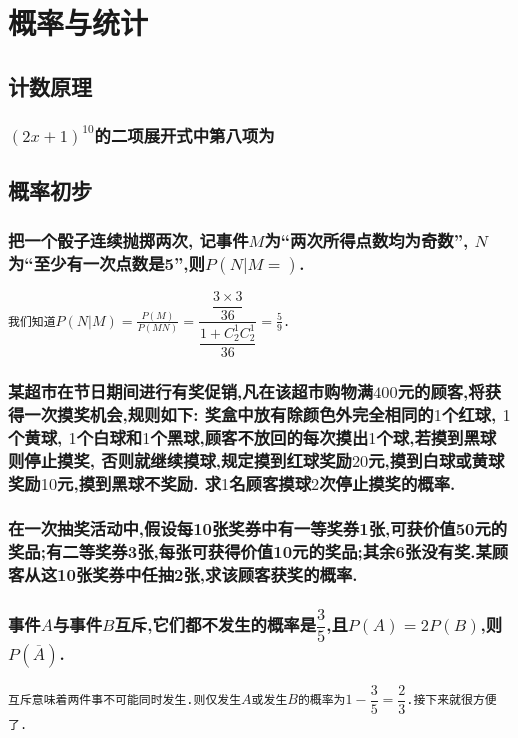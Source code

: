 \documentclass[oneside]{book}
\newcommand{\1}{\underline{\makebox[1cm]{}}}
\newcommand{\2}{\underline{\makebox[2cm]{}}}
\newcommand{\3}{\underline{\makebox[3cm]{}}}
\newcommand{\4}{\underline{\makebox[4cm]{}}}
\newcommand{\blk}{\vspace*{1\baselineskip} }
\newcommand{\blkx}{\vspace*{4\baselineskip} }
\newcommand{\blkc}{\vspace*{6\baselineskip} }
\newcommand{\lge}{\large \texttt}
\newlength{\la}
\begin{document}
\part{概率与统计}

    \chapter{计数原理}
        \section{$(2x+1)^{10}$的二项展开式中第八项为\2} 
        \blk

    \chapter{概率初步}
        \section{把一个骰子连续抛掷两次, 记事件$M$为``两次所得点数均为奇数'', $N$为``至少有一次点数是5'',则$P(N | M = )$\2.}
        \lge{我们知道$P(N|M) = \frac{P(M)}{P(MN)} = \dfrac{\dfrac{3 \times 3}{36}}{\dfrac{1 + C_2^1C_2^1}{36}} = \frac{5}{9}$.}

        \section{某超市在节日期间进行有奖促销,凡在该超市购物满$400$元的顾客,将获得一次摸奖机会,规则如下:
        奖盒中放有除颜色外完全相同的$1$个红球, $1$个黄球, $1$个白球和$1$个黑球,顾客不放回的每次摸出$1$个球,若摸到黑球则停止摸奖,
        否则就继续摸球,规定摸到红球奖励$20$元,摸到白球或黄球奖励$10$元,摸到黑球不奖励. 求$1$名顾客摸球$2$次停止摸奖的概率.}
        \blkx

        \section{在一次抽奖活动中,假设每10张奖券中有一等奖券1张,可获价值50元的奖品;有二等奖券3张,每张可获得价值10元的奖品;其余6张没有奖.某顾客从这10张奖券中任抽2张,求该顾客获奖的概率.}
        \blkc

        \section{事件$A$与事件$B$互斥,它们都不发生的概率是$\dfrac{3}{5}$,且$P(A)=2P(B)$,则$P(\overline{A}) $\2.}
        \lge{互斥意味着两件事不可能同时发生.则仅发生$A$或发生$B$的概率为$1-\dfrac{3}{5}=\dfrac{2}{3}$.接下来就很方便了.}
\end{document}
